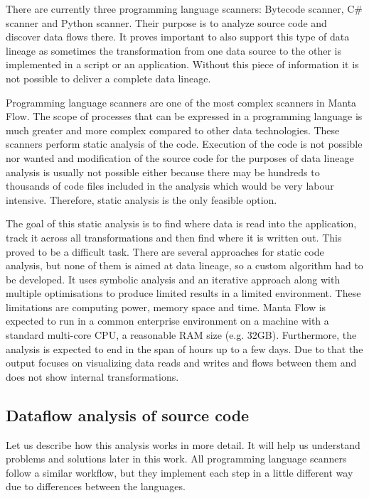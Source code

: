 There are currently three programming language scanners: Bytecode scanner, C\# scanner and Python scanner. Their purpose is to analyze source code and discover data flows there. It proves important to also support this type of data lineage as sometimes the transformation from one data source to the other is implemented in a script or an application. Without this piece of information it is not possible to deliver a complete data lineage.
\par
Programming language scanners are one of the most complex scanners in Manta Flow. The scope of processes that can be expressed in a programming language is much greater and more complex compared to other data technologies. These scanners perform static analysis of the code. Execution of the code is not possible nor wanted and modification of the source code for the purposes of data lineage analysis is usually not possible either because there may be hundreds to thousands of code files included in the analysis which would be very labour intensive. Therefore, static analysis is the only feasible option.
\par
The goal of this static analysis is to find where data is read into the application, track it across all transformations and then find where it is written out. This proved to be a difficult task. There are several approaches for static code analysis, but none of them is aimed at data lineage, so a custom algorithm had to be developed. It uses symbolic analysis and an iterative approach along with multiple optimisations to produce limited results in a limited environment. These limitations are computing power, memory space and time. Manta Flow is expected to run in a common enterprise environment on a machine with a standard multi-core CPU, a reasonable RAM size (e.g. 32GB). Furthermore, the analysis is expected to end in the span of hours up to a few days. Due to that the output focuses on visualizing data reads and writes and flows between them and does not show internal transformations.

\subsection{Dataflow analysis of source code}

Let us describe how this analysis works in more detail. It will help us understand problems and solutions later in this work. All programming language scanners follow a similar workflow, but they implement each step in a little different way due to differences between the languages.

